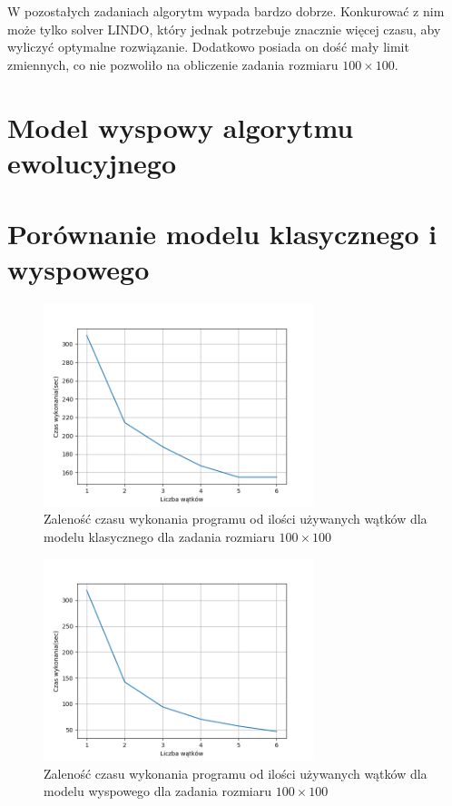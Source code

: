 W pozostałych zadaniach algorytm wypada bardzo dobrze. Konkurować z nim może tylko solver LINDO, który jednak potrzebuje znacznie więcej czasu, 
aby wyliczyć optymalne rozwiązanie. Dodatkowo posiada on dość mały limit zmiennych, co nie pozwoliło na obliczenie zadania rozmiaru $100 \times 100$. 

\section{Model wyspowy algorytmu ewolucyjnego}

\section{Porównanie modelu klasycznego i wyspowego}

\begin{figure}[H]
    \centering        
    \includegraphics[width=0.7\textwidth]{img/plot_regular_threads_100x100.png}
    \caption{Zaleność czasu wykonania programu od ilości używanych wątków dla modelu klasycznego dla zadania rozmiaru $100\times100$}
    \label{threads_regular_100x100}
\end{figure}

\begin{figure}[H]
    \centering        
    \includegraphics[width=0.7\textwidth]{img/plot_island_threads_100x100.png}
    \caption{Zaleność czasu wykonania programu od ilości używanych wątków dla modelu wyspowego dla zadania rozmiaru $100\times100$}
    \label{threads_regular_100x100}
\end{figure}

